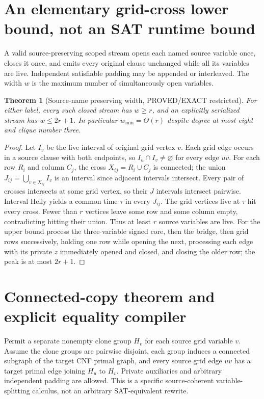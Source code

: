 \documentclass[11pt]{article}
\newtheorem{theorem}{Theorem}
\begin{document}
\section{An elementary grid-cross lower bound, not an SAT runtime bound}
A valid source-preserving scoped stream opens each named source variable once, closes it once, and emits every original clause unchanged while all its variables are live. Independent satisfiable padding may be appended or interleaved. The width $w$ is the maximum number of simultaneously open variables.

\begin{theorem}[Source-name preserving width, PROVED/EXACT restricted]
For either label, every such closed stream has $w\ge r$, and an explicitly serialized stream has $w\le2r+1$. In particular $w_{\min}=\Theta(r)$ despite degree at most eight and clique number three.
\end{theorem}
\begin{proof}
Let $I_v$ be the live interval of original grid vertex $v$. Each grid edge occurs in a source clause with both endpoints, so $I_u\cap I_v\neq\varnothing$ for every edge $uv$. For each row $R_i$ and column $C_j$, the cross $X_{ij}=R_i\cup C_j$ is connected; the union $J_{ij}=\bigcup_{v\in X_{ij}}I_v$ is an interval since adjacent intervals intersect. Every pair of crosses intersects at some grid vertex, so their $J$ intervals intersect pairwise. Interval Helly yields a common time $\tau$ in every $J_{ij}$. The grid vertices live at $\tau$ hit every cross. Fewer than $r$ vertices leave some row and some column empty, contradicting hitting their union. Thus at least $r$ source variables are live. For the upper bound process the three-variable signed core, then the bridge, then grid rows successively, holding one row while opening the next, processing each edge with its private $z$ immediately opened and closed, and closing the older row; the peak is at most $2r+1$.
\end{proof}

\section{Connected-copy theorem and explicit equality compiler}
Permit a separate nonempty clone group $H_v$ for each source grid variable $v$. Assume the clone groups are pairwise disjoint, each group induces a connected subgraph of the target CNF primal graph, and every source grid edge $uv$ has a target primal edge joining $H_u$ to $H_v$. Private auxiliaries and arbitrary independent padding are allowed. This is a specific source-coherent variable-splitting calculus, not an arbitrary SAT-equivalent rewrite.
\end{document}
